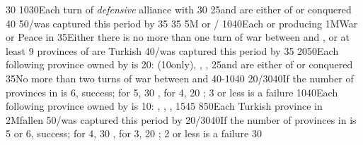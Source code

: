 {}{30}{}%
%
%
{10}{30}{Each turn of \emph{defensive} alliance with \paysmajeurFrance}%
%
%
{}{30}{}%
%
%
{}{25}{\paysvalachie and \paysmoldavie are either \VASSAL of \TUR or
  conquered}%
%
%
%
{}{40}{}%
%
%
{}{50}{\provinceOsterreich/\villeVienne was captured this period by \TUR}%
%
%
{}{35}{}%
%
%
{}{35}{}%
%
\EUobjective5M{ or }{\COL/\TP}%
{10}{40}{Each \COL or \TP producing \POSPICE}%
%
%
\EUobjective1M{War or Peace in \payshongrie}{}%
{}{35}{Either there is no more than one turn of war between \AUSaus and \TUR,
  or at least 9 provinces of \payshongrie are Turkish}%
%
%
{}{40}{\provinceOsterreich/\villeVienne was captured this period by \TUR}%
%
%
{}{35}{}%
%
%
{20}{50}{Each following province owned by \TUR is 20\VPs: \provinceCyclades
  (10\VPs only), \provinceKreta, \provinceMalta, \provinceChypre}%
%
%
{}{25}{\paysvalachie and \paysmoldavie are either \VASSAL of \TUR or
  conquered}%
%
%
%
{}{35}{No more than two turns of war between \AUSaus and \TUR}%
%
%
{40-10}{40}{\EU@objPresidiosTUR}%
%
%
{20/30}{40}{If the number of provinces in \payscrimee is 6, success; for 5, 30
  \VPs, for 4, 20 \VPs; 3 or less is a failure}%
%
%
{10}{40}{Each following province owned by \TUR is 10\VPs: \provinceCorfou,
  \provinceKreta, \provinceMalta, \provinceChypre}%
%
%
{15}{45}{\EU@objMonopolyZone}%
%
%
%
{8}{50}{Each Turkish province in \payshongrie}%
%
\EUobjective2M{\villeVienne fallen}{}%
{}{50}{\provinceOsterreich/\villeVienne was captured this period by \TUR}%
%
%
{20/30}{40}{If the number of provinces in \payscrimee is 5 or 6, success; for
  4, 30 \VPs, for 3, 20 \VPs; 2 or less is a failure}%
%
%
{}{30}{}%
%
%

